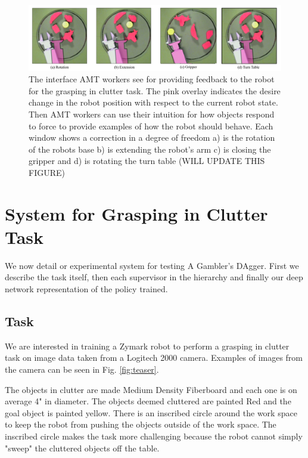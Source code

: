 \documentclass[10pt, conference]{ieeeconf}      %
\begin{document}
\begin{figure}[t]
\centering

\includegraphics[width=\textwidth]{f_figs/Labeling_GUI.pdf}

\caption{\footnotesize  The interface AMT workers see for providing feedback to the robot for the grasping in clutter task. The pink overlay indicates the desire change in the robot position with respect to the current robot state. Then AMT workers can use their intuition for how objects respond to force to provide examples of how the robot should behave. Each window shows a correction in a degree of freedom a) is the rotation of the robots base b) is extending the robot's arm c) is closing the gripper and d) is rotating the turn table (WILL UPDATE THIS FIGURE)}
\vspace*{-20pt}
\label{fig:overlays}
\end{figure}





\section{System for Grasping in Clutter Task}
We now detail or experimental system for testing A Gambler's DAgger. First we describe the task itself, then each supervisor in the hierarchy and finally our deep network representation of the policy trained. 

\subsection{Task}
We are interested in training a Zymark robot to perform a grasping in clutter task on image data taken from a Logitech 2000 camera. Examples of images from the camera can be seen in Fig. \ref{fig:teaser}.

The objects in clutter are made Medium Density Fiberboard and each one is on average 4" in diameter. The objects deemed cluttered are painted Red and the goal object is painted yellow. There is an inscribed circle around the work space to keep the robot from pushing the objects outside of the work space. The inscribed circle makes the task more challenging because the robot cannot simply "sweep" the cluttered objects off the table. 
\end{document}
